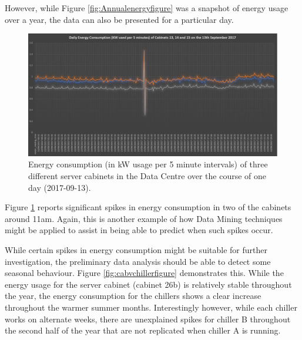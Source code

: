 \documentclass[12pt]{scrartcl}
\begin{document}
However, while Figure \ref{fig:Annualenergyfigure} was a snapshot of energy usage over a year, the data can also be presented for a particular day. 

\begin{figure}[h]
  \caption{Energy consumption (in kW usage per 5 minute intervals) of three different server cabinets in the Data Centre over the course of one day (2017-09-13).}
  \label{fig:Dailyenergyfigure}
  \centering
    \includegraphics[scale=0.35]{Daily_energy_consumption_of_cab131415}
\end{figure}
   
Figure \ref{fig:Dailyenergyfigure} reports significant spikes in energy consumption in two of the cabinets around 11am. Again, this is another example of how Data Mining techniques might be applied to assist in being able to predict when such spikes occur. 

While certain spikes in energy consumption might be suitable for further investigation, the preliminary data analysis should be able to detect some seasonal behaviour. Figure \ref{fig:cabvchillerfigure} demonstrates this. While the energy usage for the server cabinet (cabinet 26b) is relatively stable throughout the year, the energy consumption for the chillers shows a clear increase throughout the warmer summer months. Interestingly however, while each chiller works on alternate weeks, there are unexplained spikes for chiller B throughout the second half of the year that are not replicated when chiller A is running. 
\end{document}

